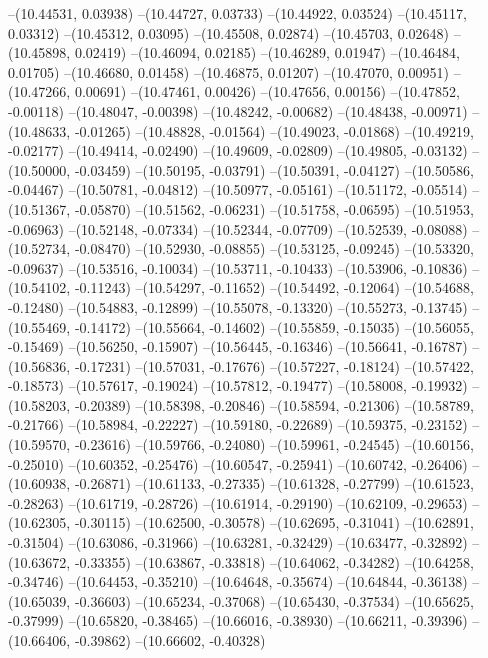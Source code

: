 --(10.44531, 0.03938)
--(10.44727, 0.03733)
--(10.44922, 0.03524)
--(10.45117, 0.03312)
--(10.45312, 0.03095)
--(10.45508, 0.02874)
--(10.45703, 0.02648)
--(10.45898, 0.02419)
--(10.46094, 0.02185)
--(10.46289, 0.01947)
--(10.46484, 0.01705)
--(10.46680, 0.01458)
--(10.46875, 0.01207)
--(10.47070, 0.00951)
--(10.47266, 0.00691)
--(10.47461, 0.00426)
--(10.47656, 0.00156)
--(10.47852, -0.00118)
--(10.48047, -0.00398)
--(10.48242, -0.00682)
--(10.48438, -0.00971)
--(10.48633, -0.01265)
--(10.48828, -0.01564)
--(10.49023, -0.01868)
--(10.49219, -0.02177)
--(10.49414, -0.02490)
--(10.49609, -0.02809)
--(10.49805, -0.03132)
--(10.50000, -0.03459)
--(10.50195, -0.03791)
--(10.50391, -0.04127)
--(10.50586, -0.04467)
--(10.50781, -0.04812)
--(10.50977, -0.05161)
--(10.51172, -0.05514)
--(10.51367, -0.05870)
--(10.51562, -0.06231)
--(10.51758, -0.06595)
--(10.51953, -0.06963)
--(10.52148, -0.07334)
--(10.52344, -0.07709)
--(10.52539, -0.08088)
--(10.52734, -0.08470)
--(10.52930, -0.08855)
--(10.53125, -0.09245)
--(10.53320, -0.09637)
--(10.53516, -0.10034)
--(10.53711, -0.10433)
--(10.53906, -0.10836)
--(10.54102, -0.11243)
--(10.54297, -0.11652)
--(10.54492, -0.12064)
--(10.54688, -0.12480)
--(10.54883, -0.12899)
--(10.55078, -0.13320)
--(10.55273, -0.13745)
--(10.55469, -0.14172)
--(10.55664, -0.14602)
--(10.55859, -0.15035)
--(10.56055, -0.15469)
--(10.56250, -0.15907)
--(10.56445, -0.16346)
--(10.56641, -0.16787)
--(10.56836, -0.17231)
--(10.57031, -0.17676)
--(10.57227, -0.18124)
--(10.57422, -0.18573)
--(10.57617, -0.19024)
--(10.57812, -0.19477)
--(10.58008, -0.19932)
--(10.58203, -0.20389)
--(10.58398, -0.20846)
--(10.58594, -0.21306)
--(10.58789, -0.21766)
--(10.58984, -0.22227)
--(10.59180, -0.22689)
--(10.59375, -0.23152)
--(10.59570, -0.23616)
--(10.59766, -0.24080)
--(10.59961, -0.24545)
--(10.60156, -0.25010)
--(10.60352, -0.25476)
--(10.60547, -0.25941)
--(10.60742, -0.26406)
--(10.60938, -0.26871)
--(10.61133, -0.27335)
--(10.61328, -0.27799)
--(10.61523, -0.28263)
--(10.61719, -0.28726)
--(10.61914, -0.29190)
--(10.62109, -0.29653)
--(10.62305, -0.30115)
--(10.62500, -0.30578)
--(10.62695, -0.31041)
--(10.62891, -0.31504)
--(10.63086, -0.31966)
--(10.63281, -0.32429)
--(10.63477, -0.32892)
--(10.63672, -0.33355)
--(10.63867, -0.33818)
--(10.64062, -0.34282)
--(10.64258, -0.34746)
--(10.64453, -0.35210)
--(10.64648, -0.35674)
--(10.64844, -0.36138)
--(10.65039, -0.36603)
--(10.65234, -0.37068)
--(10.65430, -0.37534)
--(10.65625, -0.37999)
--(10.65820, -0.38465)
--(10.66016, -0.38930)
--(10.66211, -0.39396)
--(10.66406, -0.39862)
--(10.66602, -0.40328)
